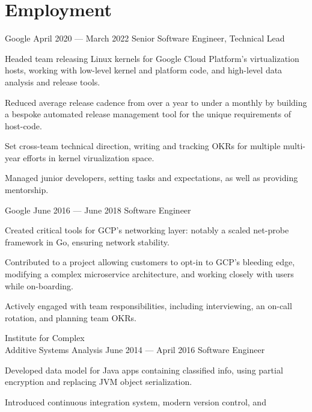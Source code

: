\documentclass{tc_cv}
\newcommand{\jobSpace}{\vspace{0.75em}}
\begin{document}
\begin{minipage}[t]{0.6\linewidth}
  \section{Employment}
  \begin{job}{Google}
    {April 2020 --- March 2022}
    {Senior Software Engineer, Technical Lead}
    \item Headed team releasing Linux kernels for Google Cloud Platform's
      virtualization hosts, working with low-level kernel and platform code,
      and high-level data analysis and release tools.
    \item Reduced average release cadence from over a year to under a monthly
      by building a bespoke automated release management tool for the unique
      requirements of host-code.
    \item Set cross-team technical direction, writing and tracking OKRs for
      multiple multi-year efforts in kernel virualization space.
    \item Managed junior developers, setting tasks and expectations, as well as
      providing mentorship.
  \end{job}
  \jobSpace
  \begin{job}{Google}
    {June 2016 --- June 2018}
    {Software Engineer}
  \item Created critical tools for GCP's networking layer: notably a scaled
    net-probe framework in Go, ensuring network stability.
  \item Contributed to a project allowing customers to opt-in to GCP's bleeding
    edge, modifying a complex microservice architecture, and working closely
    with users while on-boarding.
  \item Actively engaged with team responsibilities, including interviewing,
    an on-call rotation, and planning team OKRs.
  \end{job}
  \jobSpace
  \begin{job}{Institute for Complex \\ Additive Systems Analysis}
    {June 2014 --- April 2016}
    {Software Engineer}
    \item Developed data model for Java apps containing classified info,
      using partial encryption and replacing JVM object serialization.
    \item Introduced continuous integration system, modern version control, and

\end{job}
\end{minipage}
\end{document}
